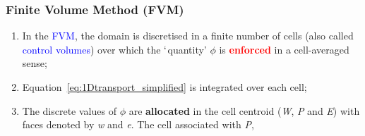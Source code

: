 \documentclass[10pt,compress]{beamer}
\begin{document}
\begin{frame}
 \frametitle{Finite Volume Method (FVM)} 

\begin{enumerate}
     \item <1-> In the \textcolor{blue}{FVM}, the domain is discretised in a finite number of cells (also called \textcolor{blue}{control volumes}) over which the $\lq$quantity' $\phi$ is \textcolor{red}{\bf enforced} in a cell-averaged sense;
     \item <2-> Equation~\ref{eq:1Dtransport_simplified} is integrated over each cell; 
     \item <3-> The discrete values of $\phi$ are {\bf allocated} in the cell centroid ({\it W}, {\it P} and {\it E}) with faces denoted by {\it w} and {\it e}. The cell associated with {\it P},
\end{enumerate}  
 
\end{frame}
\end{document}
